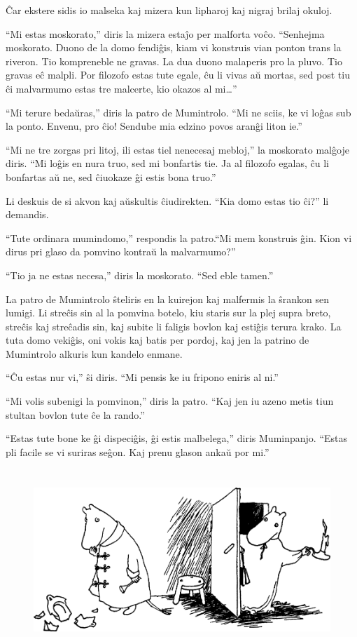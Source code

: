 Ĉar ekstere sidis io malseka kaj mizera kun lipharoj kaj nigraj brilaj okuloj.

``Mi estas moskorato,'' diris la mizera estaĵo per malforta voĉo. ``Senhejma moskorato. Duono de la domo fendiĝis, kiam vi konstruis vian ponton trans la riveron. Tio kompreneble ne gravas. La dua duono malaperis pro la pluvo. Tio gravas eĉ malpli. Por filozofo estas tute egale, ĉu li vivas aŭ mortas, sed post tiu ĉi malvarmumo estas tre malcerte, kio okazos al mi{\ldots}''

``Mi terure bedaŭras,'' diris la patro de Mumintrolo. ``Mi ne sciis, ke vi loĝas sub la ponto. Envenu, pro ĉio! Sendube mia edzino povos aranĝi liton ie.''

``Mi ne tre zorgas pri litoj, ili estas tiel nenecesaj mebloj,'' la moskorato malĝoje diris. ``Mi loĝis en nura truo, sed mi bonfartis tie. Ja al filozofo egalas, ĉu li bonfartas aŭ ne, sed ĉiuokaze ĝi estis bona truo.''

Li deskuis de si akvon kaj aŭskultis ĉiudirekten. ``Kia domo estas tio ĉi?'' li demandis.

``Tute ordinara mumindomo,'' respondis la patro.``Mi mem konstruis ĝin. Kion vi dirus pri glaso da pomvino kontraŭ la malvarmumo?''

``Tio ja ne estas necesa,'' diris la moskorato. ``Sed eble tamen.''

La patro de Mumintrolo ŝteliris en la kuirejon kaj malfermis la ŝrankon sen lumigi. Li streĉis sin al la pomvina botelo, kiu staris sur la plej supra breto, streĉis kaj streĉadis sin, kaj subite li faligis bovlon kaj estiĝis terura krako. La tuta domo vekiĝis, oni vokis kaj batis per pordoj, kaj jen la patrino de Mumintrolo alkuris kun kandelo enmane.

``Ĉu estas nur vi,'' ŝi diris. ``Mi pensis ke iu fripono eniris al ni.''

``Mi volis subenigi la pomvinon,'' diris la patro. ``Kaj jen iu azeno metis tiun stultan bovlon tute ĉe la rando.''

``Estas tute bone ke ĝi dispeciĝis, ĝi estis malbelega,'' diris Muminpanjo. ``Estas pli facile se vi suriras seĝon. Kaj prenu glason ankaŭ por mi.''

\begin{figure}[htbp]
\centering
\includegraphics[width=400pt,height=193pt]{1-11.png}
\caption{}
\label{1-11}
\end{figure}


